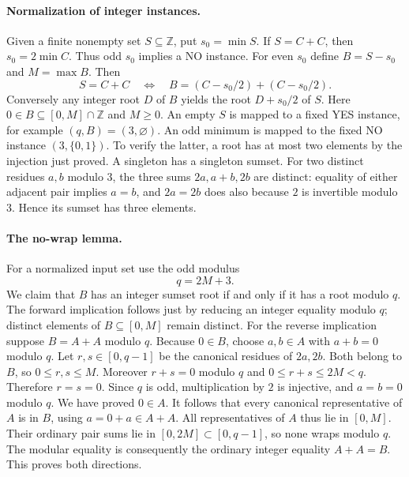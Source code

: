 \documentclass[11pt]{article}
\begin{document}
\paragraph{Normalization of integer instances.}
Given a finite nonempty set $S\subseteq\mathbb Z$, put $s_0=\min S$.
If $S=C+C$, then $s_0=2\min C$. Thus odd $s_0$ implies a NO instance.
For even $s_0$ define $B=S-s_0$ and $M=\max B$. Then
\[
 S=C+C\quad\Longleftrightarrow\quad
 B=(C-s_0/2)+(C-s_0/2).
\]
Conversely any integer root $D$ of $B$ yields the root $D+s_0/2$ of $S$.
Here $0\in B\subseteq[0,M]\cap\mathbb Z$ and $M\geq0$.
An empty $S$ is mapped to a fixed YES instance, for example $(q,B)=(3,\varnothing)$.
An odd minimum is mapped to the fixed NO instance $(3,\{0,1\})$.
To verify the latter, a root has at most two elements by the injection just proved.
A singleton has a singleton sumset. For two distinct residues $a,b$ modulo $3$,
the three sums $2a,a+b,2b$ are distinct: equality of either adjacent pair implies
$a=b$, and $2a=2b$ does also because $2$ is invertible modulo $3$.
Hence its sumset has three elements.

\paragraph{The no-wrap lemma.}
For a normalized input set use the odd modulus
\[
 q=2M+3.
\]
We claim that $B$ has an integer sumset root if and only if it has a root modulo
$q$. The forward implication follows just by reducing an integer equality
modulo $q$; distinct elements of $B\subseteq[0,M]$ remain distinct.
For the reverse implication suppose $B=A+A$ modulo $q$. Because $0\in B$,
choose $a,b\in A$ with $a+b=0$ modulo $q$.
Let $r,s\in[0,q-1]$ be the canonical residues of $2a,2b$. Both belong to $B$,
so $0\leq r,s\leq M$. Moreover $r+s=0$ modulo $q$ and
$0\leq r+s\leq2M<q$. Therefore $r=s=0$.
Since $q$ is odd, multiplication by $2$ is injective, and $a=b=0$ modulo $q$.
We have proved $0\in A$. It follows that every canonical representative of $A$
is in $B$, using $a=0+a\in A+A$. All representatives of $A$ thus lie in
$[0,M]$. Their ordinary pair sums lie in $[0,2M]\subset[0,q-1]$, so none wraps
modulo $q$. The modular equality is consequently the ordinary integer equality
$A+A=B$. This proves both directions.
\end{document}
